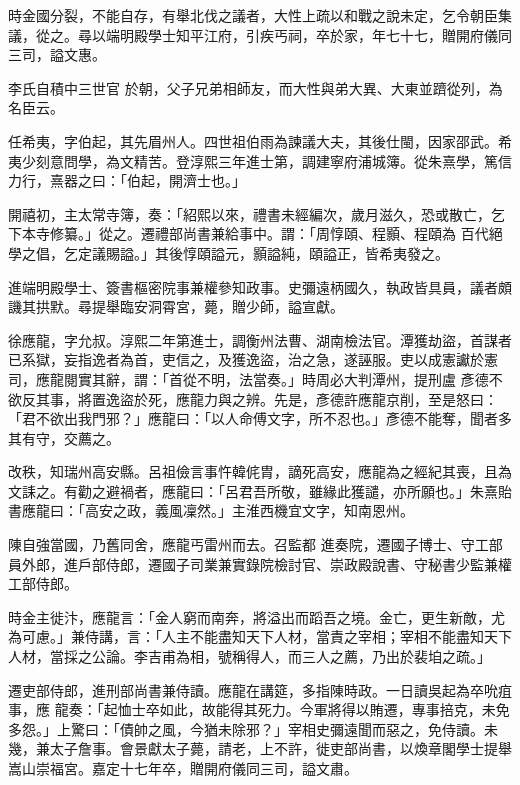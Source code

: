 \begin{pinyinscope}
 時金國分裂，不能自存，有舉北伐之議者，大性上疏以和戰之說未定，乞令朝臣集議，從之。尋以端明殿學士知平江府，引疾丐祠，卒於家，年七十七，贈開府儀同三司，謚文惠。



 李氏自積中三世官
 於朝，父子兄弟相師友，而大性與弟大異、大東並躋從列，為名臣云。



 任希夷，字伯起，其先眉州人。四世祖伯雨為諫議大夫，其後仕閩，因家邵武。希夷少刻意問學，為文精苦。登淳熙三年進士第，調建寧府浦城簿。從朱熹學，篤信力行，熹器之曰：「伯起，開濟士也。」



 開禧初，主太常寺簿，奏：「紹熙以來，禮書未經編次，歲月滋久，恐或散亡，乞下本寺修纂。」從之。遷禮部尚書兼給事中。謂：「周惇頤、程顥、程頤為
 百代絕學之倡，乞定議賜謚。」其後惇頤謚元，顥謚純，頤謚正，皆希夷發之。



 進端明殿學士、簽書樞密院事兼權參知政事。史彌遠柄國久，執政皆具員，議者頗譏其拱默。尋提舉臨安洞霄宮，薨，贈少師，謚宣獻。



 徐應龍，字允叔。淳熙二年第進士，調衡州法曹、湖南檢法官。潭獲劫盜，首謀者已系獄，妄指逸者為首，吏信之，及獲逸盜，治之急，遂誣服。吏以成憲讞於憲司，應龍閱實其辭，謂：「首從不明，法當奏。」時周必大判潭州，提刑盧
 彥德不欲反其事，將置逸盜於死，應龍力與之辨。先是，彥德許應龍京削，至是怒曰：「君不欲出我門邪？」應龍曰：「以人命傅文字，所不忍也。」彥德不能奪，聞者多其有守，交薦之。



 改秩，知瑞州高安縣。呂祖儉言事忤韓侂胄，謫死高安，應龍為之經紀其喪，且為文誄之。有勸之避禍者，應龍曰：「呂君吾所敬，雖緣此獲譴，亦所願也。」朱熹貽書應龍曰：「高安之政，義風凜然。」主淮西機宜文字，知南恩州。



 陳自強當國，乃舊同舍，應龍丐雷州而去。召監都
 進奏院，遷國子博士、守工部員外郎，進戶部侍郎，遷國子司業兼實錄院檢討官、崇政殿說書、守秘書少監兼權工部侍郎。



 時金主徙汴，應龍言：「金人窮而南奔，將溢出而蹈吾之境。金亡，更生新敵，尤為可慮。」兼侍講，言：「人主不能盡知天下人材，當責之宰相；宰相不能盡知天下人材，當採之公論。李吉甫為相，號稱得人，而三人之薦，乃出於裴垍之疏。」



 遷吏部侍郎，進刑部尚書兼侍讀。應龍在講筵，多指陳時政。一日讀吳起為卒吮疽事，應
 龍奏：「起恤士卒如此，故能得其死力。今軍將得以賄遷，專事掊克，未免多怨。」上驚曰：「債帥之風，今猶未除邪？」宰相史彌遠聞而惡之，免侍讀。未幾，兼太子詹事。會景獻太子薨，請老，上不許，徙吏部尚書，以煥章閣學士提舉嵩山崇福宮。嘉定十七年卒，贈開府儀同三司，謚文肅。




\end{pinyinscope}
